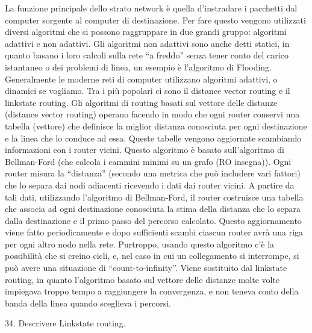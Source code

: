 La funzione principale dello strato network è quella d’instradare i pacchetti dal computer sorgente al computer di destinazione. Per fare questo vengono utilizzati diversi algoritmi che si possono raggruppare in due grandi gruppo: algoritmi adattivi e non adattivi. Gli algoritmi non adattivi sono anche detti statici, in quanto basano i loro calcoli sulla rete “a freddo” senza tener conto del carico istantaneo o dei problemi di linea, un esempio è l’algoritmo di Flooding.
Generalmente le moderne reti di computer utilizzano algoritmi adattivi, o dinamici se vogliamo. Tra i più popolari ci sono il distance vector routing e il linkstate routing.
Gli algoritmi di routing basati sul vettore delle distanze (distance vector routing) operano facendo in modo che ogni router conservi una tabella (vettore) che definisce la miglior distanza conosciuta per ogni destinazione e la linea che lo conduce ad essa. Queste tabelle vengono aggiornate scambiando informazioni con i router vicini.
Questo algoritmo è basato sull’algoritmo di Bellman-Ford (che calcola i cammini minimi su un grafo (RO insegna)).
Ogni router misura la “distanza” (secondo una metrica che può includere vari fattori) che lo separa dai nodi adiacenti ricevendo i dati dai router vicini. A partire da tali dati, utilizzando l’algoritmo di Bellman-Ford, il router costruisce una tabella che associa ad ogni destinazione conosciuta la stima della distanza che lo separa dalla destinazione e il primo passo del percorso calcolato.
Questo aggiornamento viene fatto periodicamente e dopo sufficienti scambi ciascun router avrà una riga per ogni altro nodo nella rete.
Purtroppo, usando questo algoritmo c’è la possibilità che si creino cicli, e, nel caso in cui un collegamento si interrompe, si può avere una situazione di “count-to-infinity”.
Viene sostituito dal linkstate routing, in quanto l’algoritmo basato sul vettore delle distanze molte volte impiegava troppo tempo a raggiungere la convergenza, e non teneva conto della banda della linea quando sceglieva i percorsi.

 

34.	Descrivere Linkstate routing.

